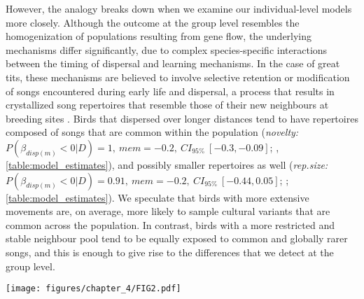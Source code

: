 However, the analogy breaks down when we examine our individual-level models more closely. Although the outcome at the group level resembles the homogenization of populations resulting from gene flow, the underlying mechanisms differ significantly, due to complex species-specific interactions between the timing of dispersal and learning mechanisms. In the case of great tits, these mechanisms are believed to involve selective retention or modification of songs encountered during early life and dispersal, a process that results in crystallized song repertoires that resemble those of their new neighbours at breeding sites \parencite{marler1982, peters2017, nelson1992}. Birds that dispersed over longer distances tend to have repertoires composed of songs that are common within the population (\textit{novelty:} $P(\beta_{disp (m)} < 0 | D) = 1,~mem = -0.2,~CI_{95\%}~[-0.3, -0.09]$; , \autoref{table:model_estimates}), and possibly smaller repertoires as well (\textit{rep.size:} $P(\beta_{disp (m)} < 0 | D) = 0.91,~mem = -0.2,~CI_{95\%}~[-0.44, 0.05]$; ; \autoref{table:model_estimates}). We speculate that birds with more extensive movements are, on average, more likely to sample cultural variants that are common across the population. In contrast, birds with a more restricted and stable neighbour pool tend to be equally exposed to common and globally rarer songs, and this is enough to give rise to the differences that we detect at the group level.



\begin{figure*}[]
    \centering
    \texttt{[image: figures/chapter\_4/FIG2.pdf]}
    \label{c4_fig:individual}
\end{figure*}

